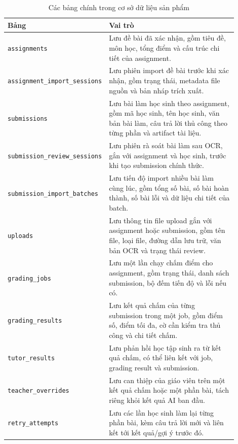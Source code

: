 \documentclass[12pt,a4paper]{article}
\begin{document}
\begin{table}[H]
    \centering
    \small
    \begin{tabular}{p{0.32\linewidth} p{0.58\linewidth}}
        \toprule
        \textbf{Bảng} & \textbf{Vai trò} \\
        \midrule
        \texttt{assignments} & Lưu đề bài đã xác nhận, gồm tiêu đề, môn học, tổng điểm và cấu trúc chi tiết của assignment. \\
        \texttt{assignment\_import\_sessions} & Lưu phiên import đề bài trước khi xác nhận, gồm trạng thái, metadata file nguồn và bản nháp trích xuất. \\
        \texttt{submissions} & Lưu bài làm học sinh theo assignment, gồm mã học sinh, tên học sinh, văn bản bài làm, câu trả lời thủ công theo từng phần và artifact tài liệu. \\
        \texttt{submission\_review\_sessions} & Lưu phiên rà soát bài làm sau OCR, gắn với assignment và học sinh, trước khi tạo submission chính thức. \\
        \texttt{submission\_import\_batches} & Lưu tiến độ import nhiều bài làm cùng lúc, gồm tổng số bài, số bài hoàn thành, số bài lỗi và dữ liệu chi tiết của batch. \\
        \texttt{uploads} & Lưu thông tin file upload gắn với assignment hoặc submission, gồm tên file, loại file, đường dẫn lưu trữ, văn bản OCR và trạng thái review. \\
        \texttt{grading\_jobs} & Lưu một lần chạy chấm điểm cho assignment, gồm trạng thái, danh sách submission, bộ đếm tiến độ và lỗi nếu có. \\
        \texttt{grading\_results} & Lưu kết quả chấm của từng submission trong một job, gồm điểm số, điểm tối đa, cờ cần kiểm tra thủ công và chi tiết chấm. \\
        \texttt{tutor\_results} & Lưu phản hồi học tập sinh ra từ kết quả chấm, có thể liên kết với job, grading result và submission. \\
        \texttt{teacher\_overrides} & Lưu can thiệp của giáo viên trên một kết quả chấm hoặc một phần bài, tách riêng khỏi kết quả AI ban đầu. \\
        \texttt{retry\_attempts} & Lưu các lần học sinh làm lại từng phần bài, kèm câu trả lời mới và liên kết tới kết quả/gợi ý trước đó. \\
        \bottomrule
    \end{tabular}
    \caption{Các bảng chính trong cơ sở dữ liệu sản phẩm}
    \label{tab:product-database-tables}
\end{table}
\end{document}
